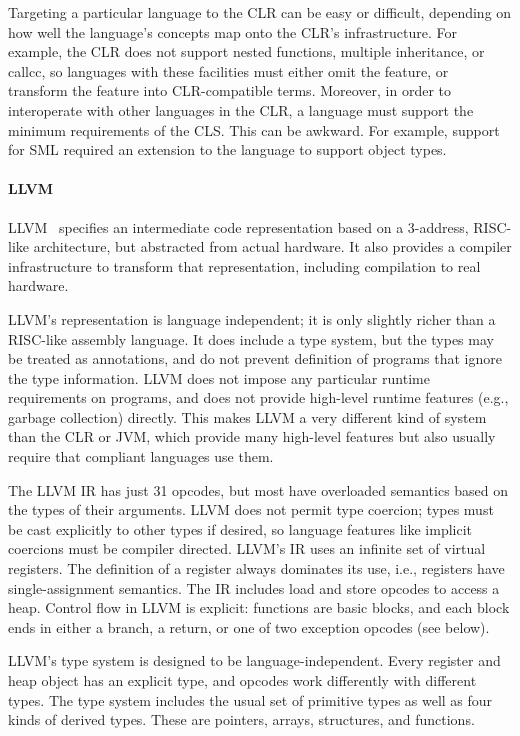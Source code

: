 Targeting a particular language to the CLR can be easy or difficult, depending on how well the language's concepts map onto the CLR's infrastructure. For example, the CLR does not support nested functions, multiple inheritance, or callcc, so languages with these facilities must either omit the feature, or transform the feature into CLR-compatible terms. Moreover, in order to interoperate with other languages in the CLR, a language must support the minimum requirements of the CLS. This can be awkward. For example, support for SML required an extension to the language to support object types.

\paragraph{LLVM}

LLVM~\cite{lattner04llvm} specifies an intermediate code representation based on a 3-address, RISC-like architecture, but abstracted from actual hardware. It also provides a compiler infrastructure to transform that representation, including compilation to real hardware.

LLVM's representation is language independent; it is only slightly richer than a RISC-like assembly language. It does include a type system, but the types may be treated as annotations, and do not prevent definition of programs that ignore the type information. LLVM does not impose any particular runtime requirements on programs, and does not provide high-level runtime features (e.g., garbage collection) directly. This makes LLVM a very different kind of system than the CLR or JVM, which provide many high-level features but also usually require that compliant languages use them.

The LLVM IR has just 31 opcodes, but most have overloaded semantics based on the types of their arguments. LLVM does not permit type coercion; types must be cast explicitly to other types if desired, so language features like implicit coercions must be compiler directed. LLVM's IR uses an infinite set of virtual registers. The definition of a register always dominates its use, i.e., registers have single-assignment semantics. The IR includes load and store opcodes to access a heap. Control flow in LLVM is explicit: functions are basic blocks, and each block ends in either a branch, a return, or one of two exception opcodes (see below).

LLVM's type system is designed to be language-independent. Every
register and heap object has an explicit type, and opcodes work
differently with different types. The type system includes the
usual set of primitive types as well as four kinds of derived
types. These are pointers, arrays, structures, and functions.

